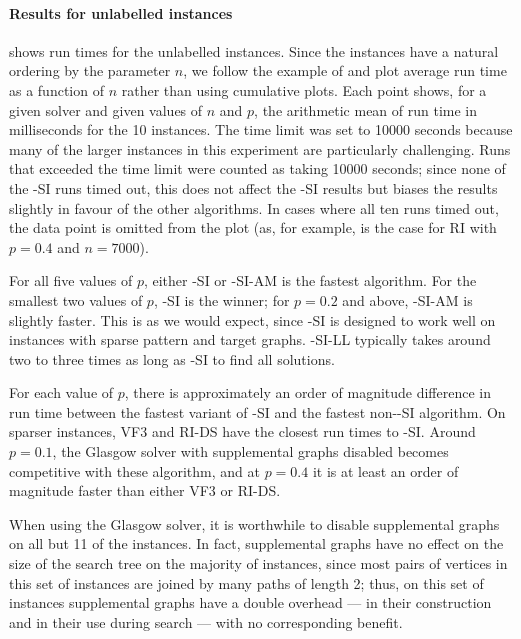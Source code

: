 \FloatBarrier

\paragraph*{Results for unlabelled instances}

 shows run times for the unlabelled instances.
Since the instances have a natural ordering by the parameter $n$, we follow the example
of \cite{DBLP:journals/pami/CarlettiFSV18} and plot average run time as a function of $n$
rather than using cumulative plots.
Each point shows, for a given solver and given values of $n$ and $p$, the arithmetic mean of
run time in milliseconds for the 10 instances.
The time limit was set to 10000 seconds because many of the larger instances in this experiment
are particularly challenging.  Runs that exceeded the time limit were counted as taking 10000 seconds;
since none of the \McSplit-SI runs timed out, this does not affect the \McSplit-SI results but biases
the results slightly in favour of the other algorithms.  In cases where all ten runs timed out,
the data point is omitted from the plot (as, for example,  is the case for RI with $p=0.4$ and $n=7000$).

For all five values of $p$, either \McSplit-SI or \McSplit-SI-AM is the fastest algorithm.  For
the smallest two values of $p$, \McSplit-SI is the winner; for $p=0.2$ and above, \McSplit-SI-AM
is slightly faster.  This is as we would expect, since \McSplit-SI is designed to work well
on instances with sparse pattern and target graphs.  
\McSplit-SI-LL typically takes around two to three times as long as \McSplit-SI to find all solutions.

For each value of $p$, there is approximately an order of magnitude difference in run time between
the fastest variant of \McSplit-SI and the fastest non-\McSplit-SI algorithm.
On sparser instances, VF3 and RI-DS have the closest run times to \McSplit-SI.  Around $p=0.1$,
the Glasgow solver with supplemental graphs disabled becomes competitive with these algorithm, and at $p=0.4$
it is at least an order of magnitude faster than either VF3 or RI-DS.

When using the Glasgow solver, it is worthwhile to disable supplemental graphs
on all but 11 of the instances.  In fact, supplemental graphs have no effect on
the size of the search tree on the majority of instances, since most pairs of
vertices in this set of instances are joined by many paths of length 2; thus,
on this set of instances supplemental graphs have a double overhead --- in
their construction and in their use during search --- with no corresponding
benefit.

